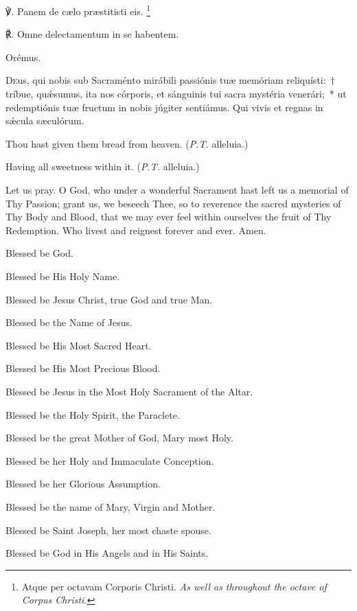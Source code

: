 \documentclass[11pt]{book}
\begin{document}
   \begin{paracol}{2}

\noindent ℣. Panem de cælo præstitisti eis. \tpalleluia{}\footnote{Atque per octavam Corporis Christi. \textit{As well as throughout the octave of Corpus Christi.}}

\noindent ℟. Omne delectamentum in se habentem. \tpalleluia{}

Orémus.
  
  \lettrine{D}{e}us, qui nobis sub Sacraménto mirábili passiónis tuæ memóriam reliquísti:~† tríbue, quǽsumus, ita nos córporis, et sánguinis tui sacra mystéria venerári;~* ut redemptiónis tuæ fructum in nobis júgiter sentiámus. Qui vivis et regnas in sǽcula sæculórum. 

  \switchcolumn
\begin{otherlanguage}{english}
\noindent \vv Thou hast given them bread from heaven. (\textit{P.T.} alleluia.)

\noindent \rr Having all sweetness within it. (\textit{P.T.} alleluia.)

\noindent Let us pray. O God, who under a wonderful Sacrament hast left us a memorial of Thy Passion; grant us, we beseech Thee, so to reverence the sacred mysteries of Thy Body and Blood, that we may ever feel within ourselves the fruit of Thy Redemption. Who livest and reignest forever and ever. Amen.
\end{otherlanguage}\end{paracol}

\begin{multicols}{2}
\raggedcolumns
\begin{otherlanguage}{english}

Blessed be God. 

Blessed be His Holy Name. 

Blessed be Jesus Christ, true God and true Man.
 
Blessed be the Name of Jesus.

Blessed be His Most Sacred Heart.

Blessed be His Most Precious Blood.

Blessed be Jesus in the Most Holy Sacrament of the Altar.

Blessed be the Holy Spirit, the Paraclete.

Blessed be the great Mother of God, Mary most Holy.

Blessed be her Holy and Immaculate Conception.


Blessed be her Glorious Assumption.

Blessed be the name of Mary, Virgin and Mother.

Blessed be Saint Joseph, her most chaste spouse.

Blessed be God in His Angels and in His Saints.

\end{otherlanguage}
\end{multicols}
\end{document}
